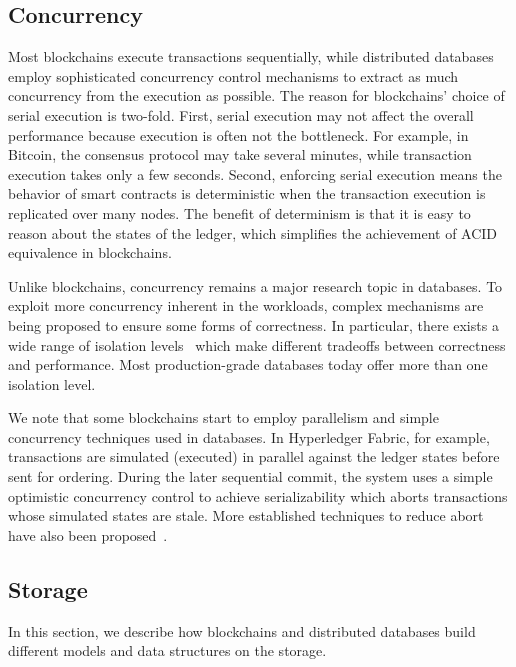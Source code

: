 \subsection{Concurrency}

Most blockchains execute transactions sequentially, while distributed databases employ sophisticated
concurrency control mechanisms to extract as much concurrency from the execution as possible. The reason for
blockchains' choice of serial execution is two-fold. First, serial execution may not affect the overall
performance because execution is often not the bottleneck. For example, in Bitcoin, the consensus protocol may
take several minutes, while transaction execution takes only a few seconds. Second, enforcing serial execution means the behavior of smart contracts
is deterministic when the transaction execution is replicated over many nodes. 
The benefit of determinism is that it is easy to reason about the states of the ledger, 
which simplifies the achievement of ACID equivalence in blockchains. 

Unlike blockchains, concurrency remains a major research topic in databases. To exploit more concurrency
inherent in the workloads, complex mechanisms are being proposed to ensure some forms of correctness. In
particular, there exists a wide range of isolation levels~\cite{computer1986american,bailis2013highly} which
make different tradeoffs between correctness and performance. Most production-grade databases today offer
more than one isolation level. 

We note that some blockchains start to employ parallelism and simple concurrency techniques used in databases. In Hyperledger Fabric,
for example, transactions are simulated (executed) in parallel against the ledger states before sent for ordering. During the later sequential commit, the
  system uses a simple optimistic concurrency control to achieve serializability which aborts
  transactions whose simulated states are stale. More established techniques to reduce abort have
  also been proposed~\cite{sharma2019blurring, ruan2020transactional}.

\subsection{Storage}
In this section, we describe how blockchains and distributed databases build different models and data
structures on the storage.  

